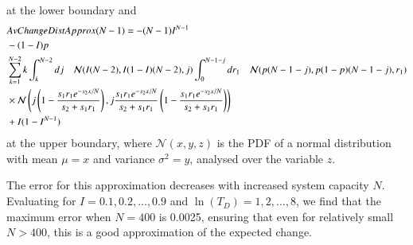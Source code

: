 at the lower boundary and 
\begin{align}
& AvChangeDistApprox(N-1)=-(N-1)I^{N-1}\\
& - (1-I)p \notag \\
& \sum_{k=1}^{N-2}k \int_k^{N-2}dj\quad \mathcal{N}(I(N-2),I(1-I)(N-2),j)\int_0^{N-1-j}dr_1\quad \mathcal{N}(p(N-1-j),p(1-p)(N-1-j),r_1) \notag \\
& \times \mathcal{N}\left(j\left(1-\frac{s_1r_1 e^{-s_2x/N}}{s_2+s_1r_1}\right),j\frac{s_1r_1 e^{-s_2x/N}}{s_2+s_1r_1}\left(1-\frac{s_1r_1 e^{-s_2x/N}}{s_2+s_1r_1}\right)\right) \notag \\
&+I(1-I^{N-1})\notag \end{align}
at the upper boundary, where $\mathcal{N}(x,y,z)$ is the PDF of a normal distribution with mean $\mu=x$ and variance $\sigma^2=y$, analysed over the variable $z$.

The error for this approximation decreases with increased system capacity $N$. Evaluating for $I=0.1,0.2,...,0.9$ and $\ln(T_D)=1,2,...,8$, we find that the maximum error when $N=400$ is 0.0025, ensuring that even for relatively small $N>400$, this is a good approximation of the expected change.



\eappendix
